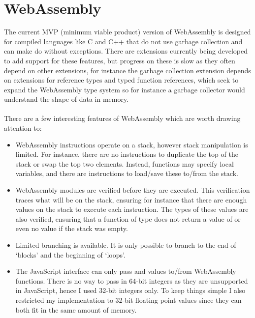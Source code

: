\section{WebAssembly}
The current MVP (minimum viable product) version of WebAssembly is designed for compiled languages like C and C++ that do not use garbage collection and can make do without exceptions. There are extensions currently being developed to add support for these features, but progress on these is slow as they often depend on other extensions, for instance the garbage collection extension depends on extensions for reference types and typed function references, which seek to expand the WebAssembly type system so for instance a garbage collector would understand the shape of data in memory\cite{Wgce}.
\\\\
There are a few interesting features of WebAssembly which are worth drawing attention to:
\begin{itemize}
    \item WebAssembly instructions operate on a stack, however stack manipulation is limited. For instance, there are no instructions to duplicate the top of the stack or swap the top two elements. Instead, functions may specify local variables, and there are instructions to load/save these to/from the stack.
    \item WebAssembly modules are verified before they are executed. This verification traces what will be on the stack, ensuring for instance that there are enough values on the stack to execute each instruction. The types of these values are also verified, ensuring that a function of type  does not return a value of  or even no value if the stack was empty.
    \item Limited branching is available. It is only possible to branch to the end of `blocks' and the beginning of `loops'.
    \item The JavaScript interface can only pass  and  values to/from WebAssembly functions. There is no way to pass in 64-bit integers as they are unsupported in JavaScript, hence I used 32-bit integers only. To keep things simple I also restricted my implementation to 32-bit floating point values since they can both fit in the same amount of memory.
\end{itemize}

